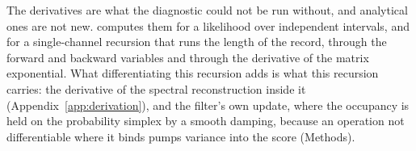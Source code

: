 \begin{appendixbox}
The derivatives are what the diagnostic could not be run without, and analytical ones are not new. \citet{milescu2005maximum} computes them for a likelihood over independent intervals, and \citet{qin2000direct} for a single-channel recursion that runs the length of the record, through the forward and backward variables and through the derivative of the matrix exponential. What differentiating this recursion adds is what this recursion carries: the derivative of the spectral reconstruction inside it (Appendix~\ref{app:derivation}), and the filter's own update, where the occupancy is held on the probability simplex by a smooth damping, because an operation not differentiable where it binds pumps variance into the score (Methods).


\end{appendixbox}
